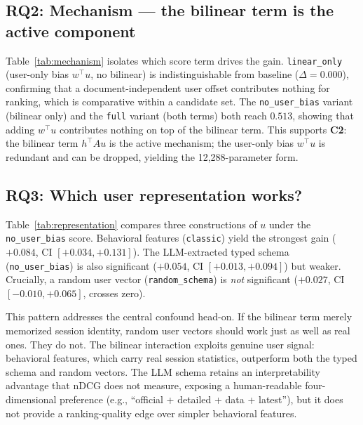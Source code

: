 

\subsection{RQ2: Mechanism --- the bilinear term is the active component}
\label{sec:exp:mechanism}

Table~\ref{tab:mechanism} isolates which score term drives the gain. \texttt{linear\_only} (user-only bias $w^\top u$, no bilinear) is indistinguishable from baseline ($\Delta = 0.000$), confirming that a document-independent user offset contributes nothing for ranking, which is comparative within a candidate set. The \texttt{no\_user\_bias} variant (bilinear only) and the \texttt{full} variant (both terms) both reach $0.513$, showing that adding $w^\top u$ contributes nothing on top of the bilinear term. This supports \textbf{C2}: the bilinear term $h^\top A u$ is the active mechanism; the user-only bias $w^\top u$ is redundant and can be dropped, yielding the 12{,}288-parameter form.



\subsection{RQ3: Which user representation works?}
\label{sec:exp:representation}

Table~\ref{tab:representation} compares three constructions of $u$ under the \texttt{no\_user\_bias} score. Behavioral features (\texttt{classic}) yield the strongest gain ($+0.084$, CI $[+0.034, +0.131]$). The LLM-extracted typed schema (\texttt{no\_user\_bias}) is also significant ($+0.054$, CI $[+0.013, +0.094]$) but weaker. Crucially, a random user vector (\texttt{random\_schema}) is \emph{not} significant ($+0.027$, CI $[-0.010, +0.065]$, crosses zero).



This pattern addresses the central confound head-on. If the bilinear term merely memorized session identity, random user vectors should work just as well as real ones. They do not. The bilinear interaction exploits genuine user signal: behavioral features, which carry real session statistics, outperform both the typed schema and random vectors. The LLM schema retains an interpretability advantage that nDCG does not measure, exposing a human-readable four-dimensional preference (e.g., ``official + detailed + data + latest''), but it does not provide a ranking-quality edge over simpler behavioral features.


